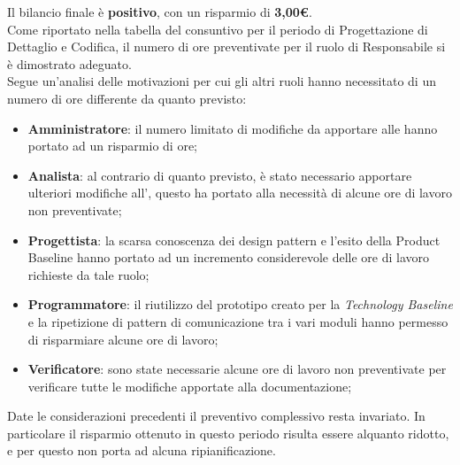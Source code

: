	Il bilancio finale è \textbf{positivo}, con un risparmio di \textbf{3,00\euro}. \\ Come riportato nella tabella del consuntivo per il periodo di Progettazione di Dettaglio e Codifica, il numero di ore preventivate per il ruolo di Responsabile si è dimostrato adeguato. \\ Segue un'analisi delle motivazioni per cui gli altri ruoli hanno necessitato di un numero di ore differente da quanto previsto: 
	\begin{itemize}
		\item \textbf{Amministratore}: il numero limitato di modifiche da apportare alle \NdP hanno portato ad un risparmio di ore;
		\item \textbf{Analista}: al contrario di quanto previsto, è stato necessario apportare ulteriori modifiche all'\AdR, questo ha portato alla necessità di alcune ore di lavoro non preventivate;
		\item \textbf{Progettista}: la scarsa conoscenza dei design pattern e l'esito della Product Baseline hanno portato ad un incremento considerevole delle ore di lavoro richieste da tale ruolo;
		\item \textbf{Programmatore}: il riutilizzo del prototipo creato per la \textit{Technology Baseline} e la ripetizione di pattern di comunicazione tra i vari moduli hanno permesso di risparmiare alcune ore di lavoro;
		\item \textbf{Verificatore}: sono state necessarie alcune ore di lavoro non preventivate per verificare tutte le modifiche apportate alla documentazione;
	\end{itemize}
	
	Date le considerazioni precedenti il preventivo complessivo resta invariato. In particolare il risparmio ottenuto in questo periodo risulta essere alquanto ridotto, e per questo non porta ad alcuna ripianificazione. 
	
	